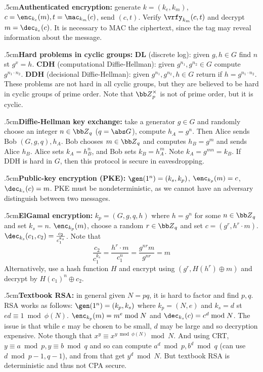 \quitvmode\kern.5cm{\bf Authenticated encryption:} generate $k=(k_e,k_m)$, $c=\enc_{k_e}(m),t=\mac_{k_m}(c)$, send $(c,t)$.
Verify $\vrfy_{k_m}(c,t)$ and decrypt $m=\dec_{k_e}(c)$.
It is necessary to MAC the ciphertext, since the tag may reveal information about the message.

\quitvmode\kern.5cm{\bf Hard problems in cyclic groups:} {\bf DL} (discrete log): given $g,h\in G$ find $n$ st $g^x=h$.
{\bf CDH} (computational Diffie-Hellman): given $g^{n_1},g^{n_2}\in G$ compute $g^{n_1\cdot n_2}$.
{\bf DDH} (decisional Diffie-Hellman): given $g^{n_1},g^{n_2},h\in G$ return if $h=g^{n_1\cdot n_2}$.
These problems are not hard in all cyclic groups, but they are believed to be hard in cyclic groups of prime order.
Note that ${\bb Z}_p^\times$ is not of prime order, but it is cyclic.

\quitvmode\kern.5cm{\bf Diffie-Hellman key exchange:} take a generator $g\in G$ and randomly choose an integer $n\in{\bb Z}_q$ ($q=\abs G$), compute $h_A=g^n$.
Then Alice sends Bob $(G,g,q),h_A$.
Bob chooses $m\in{\bb Z}_q$ and computes $h_B=g^m$ and sends Alice $h_B$.
Alice sets $k_A=h_B^n$, and Bob sets $k_B=h_A^m$.
Note $k_A=g^{mn}=k_B$.
If DDH is hard in $G$, then this protocol is secure in eavesdropping.

\quitvmode\kern.5cm{\bf Public-key encryption (PKE):} $\gen(1^n)=(k_s,k_p)$, $\enc_{k_p}(m)=c$, $\dec_{k_s}(c)=m$.
PKE must be nondeterministic, as we cannot have an adversary distinguish between two messages.

\quitvmode\kern.5cm{\bf ElGamal encryption:} $k_p=(G,g,q,h)$ where $h=g^n$ for some $n\in{\bb Z}_q$ and set $k_s=n$.
$\enc_{k_p}(m)$, choose a random $r\in{\bb Z}_q$ and set $c=(g^r,h^r\cdot m)$.
$\dec_{k_s}(c_1,c_2)=\frac{c_2}{c_1^{k_s}}$.
Note that
$$ \frac{c_2}{c_1^{k_s}} = \frac{h^r\cdot m}{c_1^n} = \frac{g^{nr}m}{g^{nr}} = m $$
Alternatively, use a hash function $H$ and encrypt using $(g^r,H(h^r)\oplus m)$ and decrypt by $H(c_1)^n\oplus c_2$.

\quitvmode\kern.5cm{\bf Textbook RSA:} in general given $N=pq$, it is hard to factor and find $p,q$.
RSA works as follows: $\gen(1^n)=(k_p,k_s)$ where $k_p=(N,e)$ and $k_s=d$ st $ed\equiv1\bmod\phi(N)$.
$\enc_{k_p}(m)=m^e\bmod N$ and $\dec_{k_s}(c)=c^d\bmod N$.
The issue is that while $e$ may be chosen to be small, $d$ may be large and so decryption expensive.
Note though that $x^y\equiv x^{y\bmod\phi(N)}\bmod N$.
And using CRT, $y\equiv a\bmod p,y\equiv b\bmod q$ and so can compute $a^d\bmod p,b^d\bmod q$ (can use $d\bmod p-1,q-1$), and from that get $y^d\bmod N$.
But textbook RSA is deterministic and thus not CPA secure.

